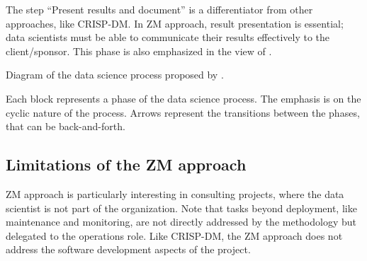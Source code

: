 The step ``Present results and document'' is a differentiator from other approaches, like
CRISP-DM.  In ZM approach, result presentation is essential; data scientists must be able
to communicate their results effectively to the client/sponsor.  This phase is also
emphasized in the view of \textcite{Wickham2023}.

\begin{figurebox}[label=fig:zumel]{Diagram of the data science process proposed by \textcite{Zumel2019}.}
  \centering

  \tcblower
  Each block represents a phase of the data science process.  The emphasis is on the
  cyclic nature of the process.  Arrows represent the transitions between the phases, that
  can be back-and-forth.
\end{figurebox}

\subsection{Limitations of the ZM approach}

ZM approach is particularly interesting in consulting projects, where the data scientist
is not part of the organization.  Note that tasks beyond deployment, like maintenance and
monitoring, are not directly addressed by the methodology but delegated to the operations
role.  Like CRISP-DM, the ZM approach does not address the software development aspects of
the project.

